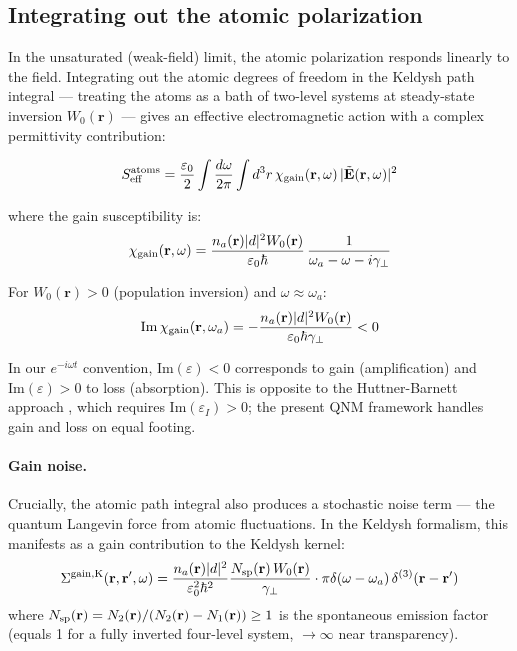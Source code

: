\documentclass[12pt]{article}
\begin{document}
\subsection{Integrating out the atomic polarization}
\label{sec:gain_integrate}

In the unsaturated (weak-field) limit, the atomic polarization responds
linearly to the field.  Integrating out the atomic degrees of freedom in
the Keldysh path integral --- treating the atoms as a bath of two-level
systems at steady-state inversion $W_0(\mathbf{r})$ --- gives an effective
electromagnetic action with a complex permittivity contribution:

\begin{equation}
  S_{\rm eff}^{\rm atoms} =
  \frac{\varepsilon_0}{2}\int\frac{d\omega}{2\pi}\int d^3r\,
  \chi_{\rm gain}(\mathbf{r},\omega)\,
  |\tilde{\mathbf{E}}(\mathbf{r},\omega)|^2
  \label{eq:atoms_effective}
\end{equation}

where the gain susceptibility is:
\begin{equation}
  \chi_{\rm gain}(\mathbf{r},\omega) =
  \frac{n_a(\mathbf{r})|d|^2 W_0(\mathbf{r})}
  {\varepsilon_0\hbar}\,
  \frac{1}{\omega_a - \omega - i\gamma_\perp}
  \label{eq:chi_gain}
\end{equation}

For $W_0(\mathbf{r}) > 0$ (population inversion) and $\omega\approx\omega_a$:
\begin{equation}
  \mathrm{Im}\,\chi_{\rm gain}(\mathbf{r},\omega_a)
  = -\frac{n_a(\mathbf{r})|d|^2 W_0(\mathbf{r})}
  {\varepsilon_0\hbar\gamma_\perp} < 0
  \label{eq:gain_sign}
\end{equation}

In our $e^{-i\omega t}$ convention, $\mathrm{Im}(\varepsilon) < 0$ corresponds
to gain (amplification) and $\mathrm{Im}(\varepsilon) > 0$ to loss (absorption).
This is opposite to the Huttner-Barnett approach \cite{Gruner1996}, which
requires $\mathrm{Im}(\varepsilon_I) > 0$; the present QNM framework
handles gain and loss on equal footing.

\paragraph{Gain noise.}
Crucially, the atomic path integral also produces a stochastic noise term
--- the quantum Langevin force from atomic fluctuations.  In the Keldysh
formalism, this manifests as a gain contribution to the Keldysh kernel:
\begin{equation}
  \Sigma^{\rm gain,K}(\mathbf{r},\mathbf{r}',\omega) =
  \frac{n_a(\mathbf{r})|d|^2}{\varepsilon_0^2\hbar^2}
  \frac{N_{\rm sp}(\mathbf{r})\,W_0(\mathbf{r})}{\gamma_\perp}
  \cdot\pi\delta(\omega-\omega_a)\,\delta^{(3)}(\mathbf{r}-\mathbf{r}')
  \label{eq:gain_noise_kernel}
\end{equation}
where $N_{\rm sp}(\mathbf{r}) = N_2(\mathbf{r})/(N_2(\mathbf{r})-N_1(\mathbf{r}))
\geq 1$ is the spontaneous emission factor (equals 1 for a fully inverted
four-level system, $\to\infty$ near transparency).
\end{document}
